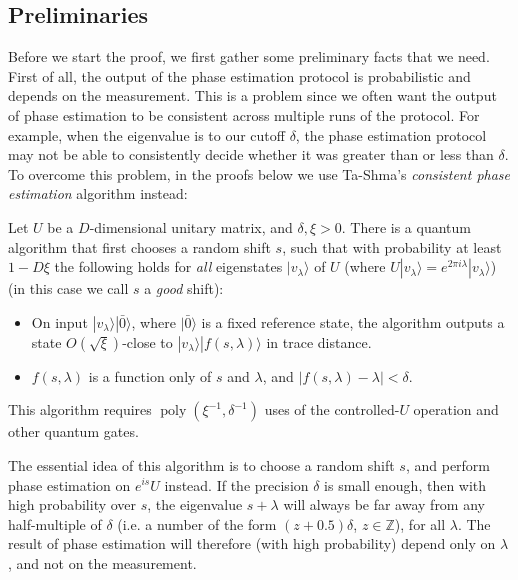 \documentclass[a4paper,UKenglish,cleveref, autoref]{lipics-v2019}
\theoremstyle{remark}
\numberwithin{equation}{section}
\numberwithin{oracle}{section}
\numberwithin{remark}{section}
\newcommand{\ket}[1]{|#1\rangle}
\DeclareMathOperator{\poly}{poly}
\begin{document}
\subsection{Preliminaries}
Before we start the proof, we first gather some preliminary facts that we need. First of all, the output of the phase estimation protocol is probabilistic and depends on the measurement. This is a problem since we often want the output of phase estimation to be consistent across multiple runs of the protocol. For example, when the eigenvalue is to our cutoff $\delta$, the phase estimation protocol may not be able to consistently decide whether it was greater than or less than $\delta$. To overcome this problem, in the proofs below we use Ta-Shma's \emph{consistent phase estimation} algorithm instead:
\begin{lemma} \label{lem: consistent}
Let $U$ be a $D$-dimensional unitary matrix, and $\delta, \xi > 0$. There is a quantum algorithm that first chooses a random shift $s$, such that with probability at least $1-D\xi$ the following holds for \emph{all} eigenstates $\ket{v_\lambda}$ of $U$ (where $U\ket{v_\lambda} = e^{2 \pi i \lambda} \ket{v_\lambda}$) (in this case we call $s$ a \emph{good} shift):
\begin{itemize}
\item On input $\ket{v_\lambda}\ket{\bar{0}}$, where $\ket{\bar{0}}$ is a fixed reference state, the algorithm outputs a state $O(\sqrt{\xi})$-close to $\ket{v_\lambda}\ket{f(s,\lambda)}$ in trace distance.
\item $f(s,\lambda)$ is a function only of $s$ and $\lambda$, and $|f(s,\lambda) - \lambda| < \delta$.
\end{itemize}
This algorithm requires $\poly(\xi^{-1},\delta^{-1})$ uses of the controlled-$U$ operation and other quantum gates.
\end{lemma}
The essential idea of this algorithm is to choose a random shift $s$, and perform phase estimation on $e^{is} U$ instead. If the precision $\delta$ is small enough, then with high probability over $s$, the eigenvalue $s+\lambda$ will always be far away from any half-multiple of $\delta$ (i.e. a number of the form $(z + 0.5) \delta$, $z \in \mathbb{Z}$), for all $\lambda$. The result of phase estimation will therefore (with high probability) depend only on $\lambda$, and not on the measurement.
\end{document}
